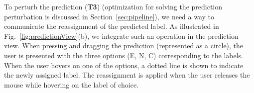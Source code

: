To perturb the prediction (\textbf{T3}) (optimization for solving the prediction perturbation is discussed in Section~\ref{sec:pipeline}), we need a way to communicate the reassignment of the predicted label. As illustrated in Fig.~\ref{fig:predictionView}(b), we integrate such an operation in the prediction view. When pressing and dragging the prediction (represented as a circle), the user is presented with the three options (E, N, C) corresponding to the labels. When the user hovers on one of the options, a dotted line is shown to indicate the newly assigned label. The reassignment is applied when the user releases the mouse while hovering on the label of choice.


